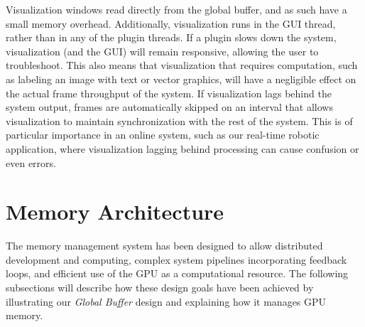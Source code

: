Visualization windows read directly from the global buffer, and as such have a small memory overhead. Additionally, visualization runs in the GUI thread, rather than in any of the plugin threads. If a plugin slows down the system, visualization (and the GUI) will remain responsive, allowing the user to troubleshoot. This also means that visualization that requires computation, such as labeling an image with text or vector graphics, will have a negligible effect on the actual frame throughput of the system. If visualization lags behind the system output, frames are automatically skipped on an interval that allows visualization to maintain synchronization with the rest of the system. This is of particular importance in an online system, such as our real-time robotic application, where visualization lagging behind processing can cause confusion or even errors.


\section{Memory Architecture}
The memory management system has been designed to allow distributed development and computing, complex system pipelines incorporating feedback loops, and efficient use of the GPU as a computational resource. The following subsections will describe how these design goals have been achieved by illustrating our \emph{Global Buffer} design and explaining how it manages GPU memory.  

